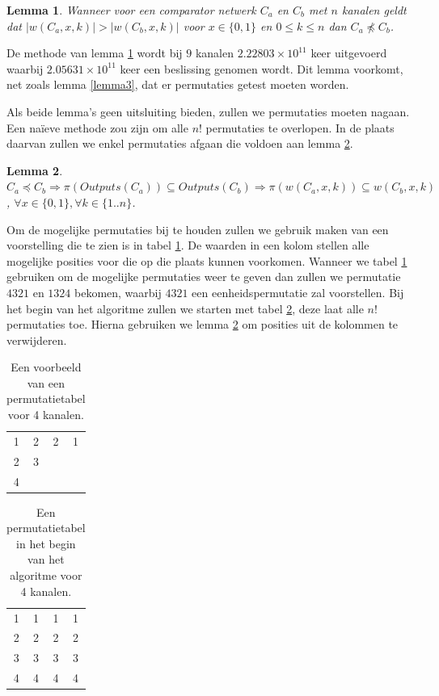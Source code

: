 \documentclass{article}
\newtheorem{lemma}{Lemma}
\begin{document}
\begin{lemma}
	Wanneer voor een comparator netwerk $C_a$ en $C_b$ met $n$ kanalen geldt dat $|w\left(C_a, x, k\right)| > |w\left(C_b, x, k\right)|$ voor $x \in \{0,1\}$ en $0 \leq k \leq n$ dan $C_a \npreceq C_b$.
	\label{lemma4}
\end{lemma}
De methode van lemma \ref{lemma4} wordt bij $9$ kanalen ${2.22803 \times 10^{11}}$ keer uitgevoerd waarbij $2.05631 \times 10^{11}$ keer een beslissing genomen wordt.
Dit lemma voorkomt, net zoals lemma \ref{lemma3}, dat er permutaties getest moeten worden.

Als beide lemma's geen uitsluiting bieden, zullen we permutaties moeten nagaan.
Een na\"ieve methode zou zijn om alle $n!$ permutaties te overlopen.
In de plaats daarvan zullen we enkel permutaties afgaan die voldoen aan lemma \ref{lemma5}\cite{sortingNetworksSize2014}.
\begin{lemma}
	${C_a \preceq C_b  \Rightarrow \pi\left(Outputs\left(C_{a}\right)\right) \subseteq Outputs\left(C_{b}\right)} \Rightarrow \pi\left(w\left(C_a, x, k\right)\right) \subseteq w\left(C_b, x, k\right)$,
	${\forall x \in \{0,1\}, \forall k \in \{1..n\}}$.
\label{lemma5}
\end{lemma}

Om de mogelijke permutaties bij te houden zullen we gebruik maken van een voorstelling die te zien is in tabel \ref{tabel4}.
De waarden in een kolom stellen alle mogelijke posities voor die op die plaats kunnen voorkomen.
Wanneer we tabel  \ref{tabel4} gebruiken om de mogelijke permutaties weer te geven dan zullen we permutatie $4321$ en $1324$  bekomen, waarbij $4321$ een eenheidspermutatie zal voorstellen.
Bij het begin van het algoritme zullen we starten met tabel \ref{tabel5}, deze laat alle $n!$ permutaties toe.
Hierna gebruiken we lemma \ref{lemma5} om posities uit de kolommen te verwijderen.
\begin{table}[!h]
	\centering
	\begin{tabular}{|c|c|c|c|}
	\hline
	1 & 2 & 2 & 1 \\ 
	2 & 3 &  &  \\ 
	4 &  &  &  \\ 
	\hline 
	\end{tabular}
	\caption{Een voorbeeld van een permutatietabel voor 4 kanalen.}
	\label{tabel4}
\end{table}
\begin{table}[!h]
	\centering
	\begin{tabular}{|c|c|c|c|}
	\hline
	1 & 1 & 1 & 1 \\ 
	2 & 2 & 2 & 2\\ 
	3 & 3 & 3 & 3 \\
	4 & 4 & 4 & 4\\ 
	\hline 
	\end{tabular}
	\caption{Een permutatietabel in het begin van het algoritme voor 4 kanalen.}
\label{tabel5}
\end{table}
\end{document}

